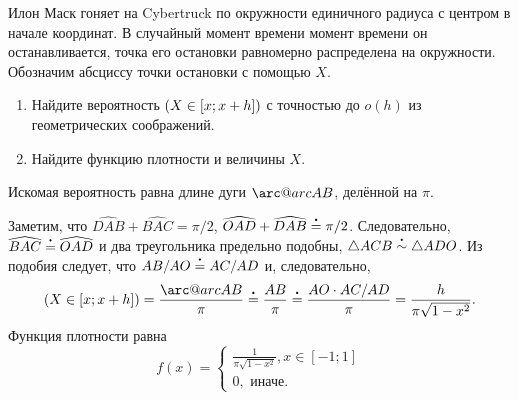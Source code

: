\documentclass[12pt]{article}
\makeatletter
\let\P\relax
\DeclareMathOperator{\P}{\mathbb{P}}
\newcommand{\arc@char}{{\usefont{U}{tipa}{m}{n}\symbol{62}}}%
\newcommand{\arc}[1]{\mathpalette\arc@arc{#1}}
\newcommand{\arc@arc}[2]{%
  \sbox0{$\m@th#1#2$}%
  \vbox{
    \hbox{\resizebox{\wd0}{\height}{\arc@char}}
    \nointerlineskip
    \box0
  }%
}
\newcommand\vardot[1][.4]{\mathbin{\vcenter{\hbox{\scalebox{#1}{$\bullet$}}}}}
\newcommand{\ulteq}{\mathrel{\overset{\vardot}{=}}}
\newcommand{\ultsim}{\mathrel{\overset{\vardot}{\sim}}}
\newcommand{\angl}[1]{\widehat{#1}}
\makeatother
\begin{document}
Илон Маск гоняет на Cybertruck по окружности единичного радиуса с центром в начале координат.
В случайный момент времени момент времени он останавливается, точка его остановки равномерно распределена на окружности.
Обозначим абсциссу точки остановки с помощью $X$.
\begin{enumerate}
  \item Найдите вероятность $\P(X \in [x; x+ h])$ с точностью до $o(h)$ из геометрических соображений.
  \item Найдите функцию плотности и величины $X$.
\end{enumerate}

  Искомая вероятность равна длине дуги $\arc{AB}$, делённой на $\pi$.

  Заметим, что $\angl{DAB} + \angl{BAC} = \pi/2$, $\angl{OAD} + \angl{DAB} \ulteq \pi/2$.
  Следовательно, $\angl{BAC} \ulteq \angl{OAD}$ и два треугольника предельно подобны, $\triangle ACB \ultsim \triangle ADO$.
  Из подобия следует, что $AB/AO \ulteq AC/AD$ и, следовательно,
  \[
  \P(X \in [x; x + h]) = \frac{\arc{AB}}{\pi} \ulteq \frac{AB}{\pi}  \ulteq \frac{AO \cdot AC/AD}{\pi} = \frac{h}{\pi\sqrt{1 - x^2}}.
  \] 
  Функция плотности равна
  \[
  f(x) = \begin{cases}
    \frac{1}{\pi\sqrt{1 - x^2}}, x \in [-1;1] \\
    0, \text{ иначе}.
  \end{cases}
  \]
\end{document}
